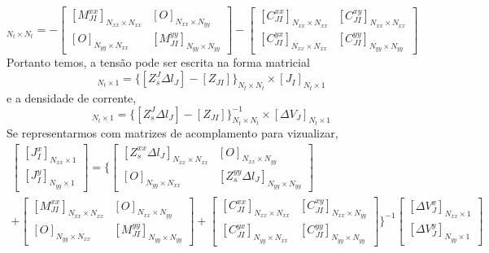 \documentclass[
	12pt,				%
	openright,			%
	oneside,			%
	a4papey79r,			%
	english,			%
	brazil				%
	]{abntex2}
\begin{document}
\begin{equation}
 [Z_{JI}]_{N_t \times N_t}=-
   \begin{bmatrix}[M_{JI}^{xx}]_{N_{xx}\times N_{xx}}& [O]_{N_{xx}\times N_{yy}}\\
   [O]_{N_{yy}\times N_{xx}}&[M_{JI}^{yy}]_{N_{yy}\times N_{yy}}
   \end{bmatrix}-
   \begin{bmatrix}[C_{JI}^{xx}]_{N_{xx}\times N_{xx}}& [C_{JI}^{xy}]_{N_{xx}\times N_{xx}}\\
   [C_{JI}^{yx}]_{N_{xx}\times N_{xx}}&[C_{JI}^{yy}]_{N_{yy}\times N_{yy}}
   \end{bmatrix}
\end{equation}
Portanto temos, a tensão pode ser escrita na forma matricial
\begin{equation}
  [\Delta V_J]_{N_t \times 1} =\{ [Z_{s}^J\Delta l_J]-[Z_{JI}]\}_{N_t \times N_t}\times[J_I]_{N_t \times 1}
\end{equation} 
e a densidade de corrente,
\begin{equation}
  [J_I]_{N_t \times 1}=\{ [Z_{s}^J\Delta l_J]-[Z_{JI}]\}^{-1}_{N_t \times N_t} \times[\Delta V_J]_{N_t \times 1} 
\end{equation} 
Se representarmos com matrizes de acomplamento  para vizualizar,
\begin{equation}
\begin{aligned}
  \begin{bmatrix} [J^{x}_I]_{N_{xx}\times 1} \\ [J^{y}_I]_{N_{yy}\times 1}\end{bmatrix}  =\Biggl\{\begin{bmatrix}[Z_s^{xx}\Delta l_J]_{N_{xx}\times N_{xx}}& [O]_{N_{xx}\times N_{yy}}\\
   [O]_{N_{yy}\times N_{xx}}&[Z_s^{yy}\Delta l_J]_{N_{yy}\times N_{yy}}
   \end{bmatrix} 
   \\+
   \begin{bmatrix}[M_{JI}^{xx}]_{N_{xx}\times N_{xx}}& [O]_{N_{xx}\times N_{yy}}\\
   [O]_{N_{yy}\times N_{xx}}&[M_{JI}^{yy}]_{N_{yy}\times N_{yy}}
   \end{bmatrix}+
   \begin{bmatrix}[C_{JI}^{xx}]_{N_{xx}\times N_{xx}}& [C_{JI}^{xy}]_{N_{xx}\times N_{yy}}\\
   [C_{JI}^{yx}]_{N_{yy}\times N_{xx}}&[C_{JI}^{yy}]_{N_{yy}\times N_{yy}}
   \end{bmatrix} \Biggl\}^{-1}
\begin{bmatrix}[\Delta V^{x}_J]_{N_{xx}\times 1} \\ [\Delta V^{y}_J]_{N_{yy}\times 1}\end{bmatrix}
   \end{aligned}
\end{equation}
\end{document}
